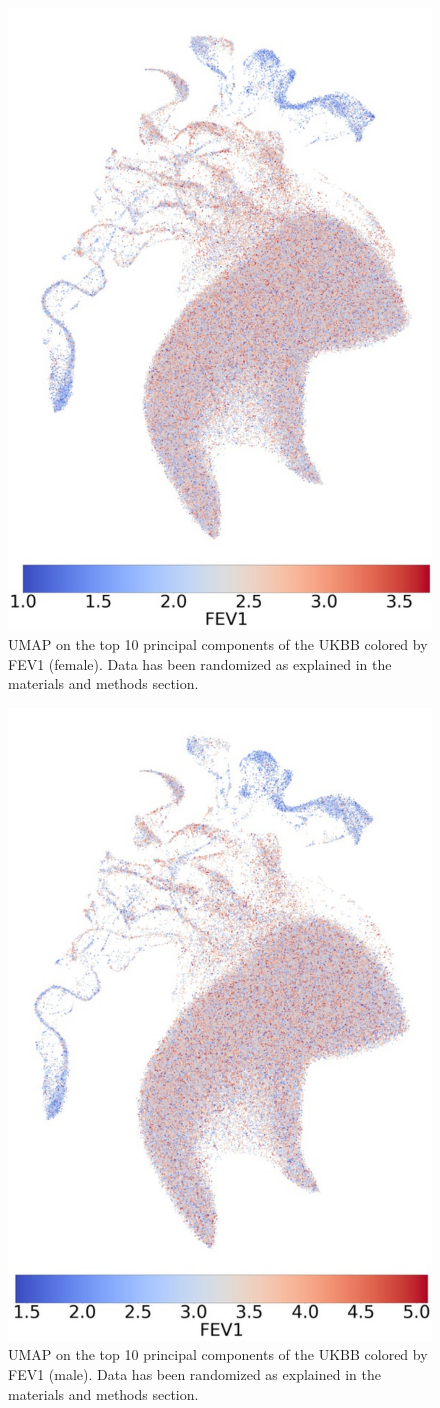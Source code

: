 \documentclass[12pt]{pnas-new}
\begin{document}
\begin{figure}
    \centering
    \includegraphics[width=0.4\columnwidth]{images/UKBB_UMAP_PC10_NN15_MD05_2018328174511_201871416305_3063_0_0_pct1_f.pdf}
    \caption{UMAP on the top 10 principal components of the UKBB colored by FEV1 (female). Data has been randomized as explained in the materials and methods section.}
    \label{fig:supp_ukbb_fev_f}
\end{figure}

\begin{figure}
    \centering
    \includegraphics[width=0.4\columnwidth]{images/UKBB_UMAP_PC10_NN15_MD05_2018328174511_201871416305_3063_0_0_pct1_m.pdf}
    \caption{UMAP on the top 10 principal components of the UKBB colored by FEV1 (male). Data has been randomized as explained in the materials and methods section.}
    \label{fig:supp_ukbb_fev_m}
\end{figure}
\end{document}
